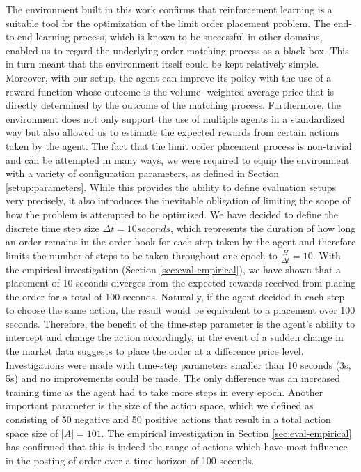     The environment built in this work confirms that reinforcement learning is a suitable tool for the optimization of the limit order placement problem.
    The end-to-end learning process, which is known to be successful in other domains\cite{amodei2016deep, mnih2015human, mnih2013playing}, enabled us to regard the underlying order matching process as a black box.
    This in turn meant that the environment itself could be kept relatively simple.
    Moreover, with our setup, the agent can improve its policy with the use of a reward function whose outcome is the volume- weighted average price that is directly determined by the outcome of the matching process.
    Furthermore, the environment does not only support the use of multiple agents in a standardized way but also allowed us to estimate the expected rewards from certain actions taken by the agent.
    The fact that the limit order placement process is non-trivial and can be attempted in many ways, we were required to equip the environment with a variety of configuration parameters, as defined in Section \ref{setup:parameters}.
    While this provides the ability to define evaluation setups very precisely, it also introduces the inevitable obligation of limiting the scope of how the problem is attempted to be optimized.
    We have decided to define the discrete time step size $\Delta{t}=10 seconds$, which represents the duration of how long an order remains in the order book for each step taken by the agent and therefore limits the number of steps to be taken throughout one epoch to $\frac{H}{\Delta{t}}=10$.
    With the empirical investigation (Section \ref{sec:eval-empirical}), we have shown that a placement of 10 seconds diverges from the expected rewards received from placing the order for a total of 100 seconds.
    Naturally, if the agent decided in each step to choose the same action, the result would be equivalent to a placement over 100 seconds.
    Therefore, the benefit of the time-step parameter is the agent's ability to intercept and change the action accordingly, in the event of a sudden change in the market data suggests to place the order at a difference price level.
    Investigations were made with time-step parameters smaller than 10 seconds (3s, 5s) and no improvements could be made.
    The only difference was an increased training time as the agent had to take more steps in every epoch.
    Another important parameter is the size of the action space, which we defined as consisting of 50 negative and 50 positive actions that result in a total action space size of $|A|=101$.
    The empirical investigation in Section \ref{sec:eval-empirical} has confirmed that this is indeed the range of actions which have most influence in the posting of order over a time horizon of 100 seconds.
